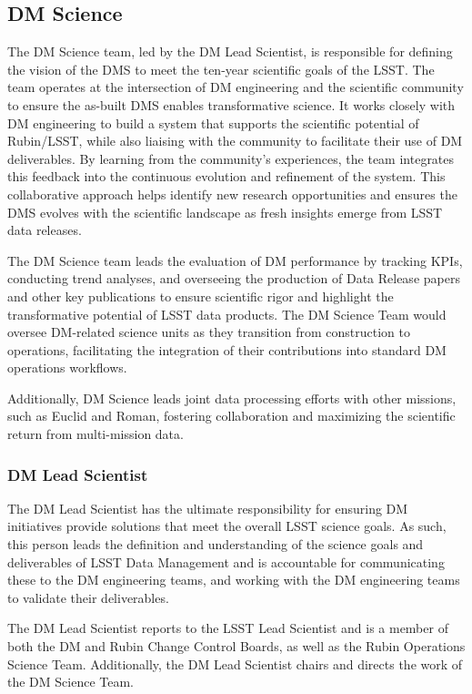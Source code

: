 \subsection{DM Science} \label{sec:dmsci}
%
The DM Science team, led by the DM Lead Scientist, is responsible for defining the vision of the DMS to meet the ten-year scientific goals of the LSST.
The team operates at the intersection of DM engineering and the scientific community to ensure the as-built DMS enables transformative science.
It works closely with DM engineering to build a system that supports the scientific potential of Rubin/LSST, while also liaising with the community to facilitate their use of DM deliverables.
By learning from the community’s experiences, the team integrates this feedback into the continuous evolution and refinement of the system.
This collaborative approach helps identify new research opportunities and ensures the DMS evolves with the scientific landscape as fresh insights emerge from LSST data releases.

The DM Science team leads the evaluation of DM performance by tracking KPIs, conducting trend analyses, and overseeing the production of Data Release papers and other key publications to ensure scientific rigor and highlight the transformative potential of LSST data products.
The DM  Science Team would  oversee DM-related science units as they transition from construction to operations, facilitating the integration of their contributions into standard DM operations workflows.

Additionally, DM Science leads joint data processing efforts with other missions, such as Euclid and Roman, fostering collaboration and maximizing the scientific return from multi-mission data.

\subsubsection{DM Lead Scientist }

The DM Lead Scientist has the ultimate responsibility for ensuring DM initiatives provide solutions that meet the overall LSST science goals.
As such, this person leads the definition and understanding of the science goals and deliverables of LSST Data Management and is accountable for communicating these to the DM engineering teams, and working with the DM engineering teams to validate their deliverables.

The DM Lead Scientist reports to the LSST Lead Scientist and is a member of both the DM and Rubin Change Control Boards, as well as the Rubin Operations Science Team.
Additionally, the DM Lead Scientist chairs and directs the work of the DM Science Team.

